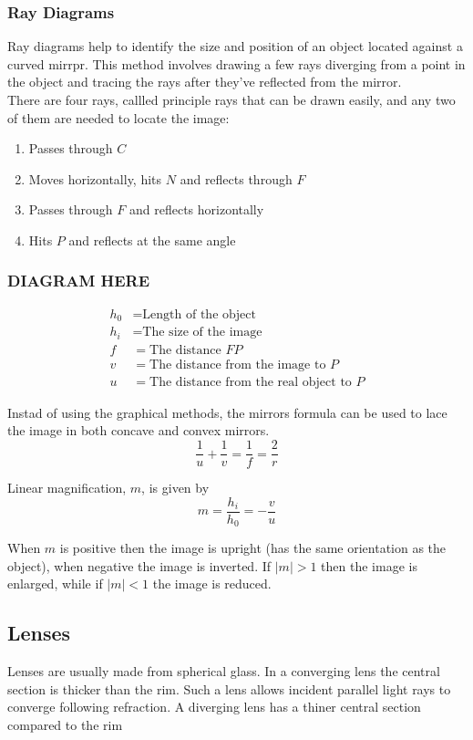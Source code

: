 \documentclass[a4paper, 12pt]{article}
\begin{document}
		\subsubsection{Ray Diagrams}
			Ray diagrams help to identify the size and position of an object located against a curved mirrpr. This method involves drawing a few rays diverging from a point in the object and tracing the rays after they've reflected from the mirror. \\
			There are four rays, callled principle rays that can be drawn easily, and any two of them are needed to locate the image:
			\begin{enumerate}	
				\item Passes through $C$
				\item Moves horizontally, hits $N$ and reflects through $F$
				\item Passes through $F$ and reflects horizontally 
				\item Hits $P$ and reflects at the same angle
			\end{enumerate}
		
			\subsubsection*{DIAGRAM HERE}
			
			\begin{align*}
				h_0 &= \text{Length of the object} \\
				h_i &= \text{The size of the image} \\
				f &= \text{The distance $FP$} \\
				v &= \text{The distance from the image to $P$} \\
				u &= \text{The distance from the real object to $P$} 
			\end{align*} 		
			
			Instad of using the graphical methods, the mirrors formula can be used to lace the image in both concave and convex mirrors. 
			\[ \frac{1}{u}+\frac{1}{v} = \frac{1}{f} = \frac{2}{r} \]
			
			
			
			
			
			
			Linear magnification, $m$, is given by
			\[ m=\frac{h_i}{h_0}=-\frac{v}{u} \]
			
			When $m$ is positive then the image is upright (has the same orientation as the object), when negative the image is inverted. If $|m|> 1$ then the image is enlarged, while if $|m| < 1$ the image is reduced.
			
	\subsection{Lenses}
		Lenses are usually made from spherical glass. In a converging lens the central section is thicker than the rim. Such a lens allows incident parallel light rays to converge following refraction. A diverging lens has a thiner central section compared to the rim 
		
\end{document}
